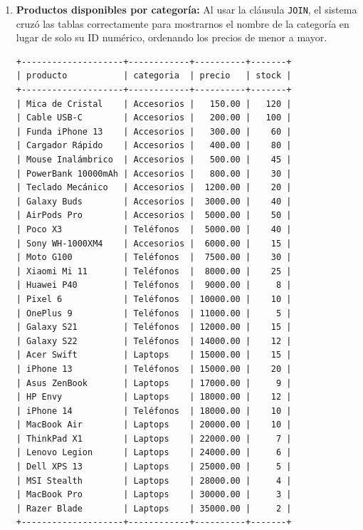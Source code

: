 \documentclass[10pt,letterpaper]{article}
\begin{document}
\begin{enumerate}
    \item \textbf{Productos disponibles por categor\'ia:}
    Al usar la cl\'ausula \texttt{JOIN}, el sistema cruz\'o las tablas correctamente para mostrarnos el nombre de la categor\'ia en lugar de solo su ID num\'erico, ordenando los precios de menor a mayor.
\begin{verbatim}
+--------------------+------------+----------+-------+
| producto           | categoria  | precio   | stock |
+--------------------+------------+----------+-------+
| Mica de Cristal    | Accesorios |   150.00 |   120 |
| Cable USB-C        | Accesorios |   200.00 |   100 |
| Funda iPhone 13    | Accesorios |   300.00 |    60 |
| Cargador Rápido    | Accesorios |   400.00 |    80 |
| Mouse Inalámbrico  | Accesorios |   500.00 |    45 |
| PowerBank 10000mAh | Accesorios |   800.00 |    30 |
| Teclado Mecánico   | Accesorios |  1200.00 |    20 |
| Galaxy Buds        | Accesorios |  3000.00 |    40 |
| AirPods Pro        | Accesorios |  5000.00 |    50 |
| Poco X3            | Teléfonos  |  5000.00 |    40 |
| Sony WH-1000XM4    | Accesorios |  6000.00 |    15 |
| Moto G100          | Teléfonos  |  7500.00 |    30 |
| Xiaomi Mi 11       | Teléfonos  |  8000.00 |    25 |
| Huawei P40         | Teléfonos  |  9000.00 |     8 |
| Pixel 6            | Teléfonos  | 10000.00 |    10 |
| OnePlus 9          | Teléfonos  | 11000.00 |     5 |
| Galaxy S21         | Teléfonos  | 12000.00 |    15 |
| Galaxy S22         | Teléfonos  | 14000.00 |    12 |
| Acer Swift         | Laptops    | 15000.00 |    15 |
| iPhone 13          | Teléfonos  | 15000.00 |    20 |
| Asus ZenBook       | Laptops    | 17000.00 |     9 |
| HP Envy            | Laptops    | 18000.00 |    12 |
| iPhone 14          | Teléfonos  | 18000.00 |    10 |
| MacBook Air        | Laptops    | 20000.00 |    10 |
| ThinkPad X1        | Laptops    | 22000.00 |     7 |
| Lenovo Legion      | Laptops    | 24000.00 |     6 |
| Dell XPS 13        | Laptops    | 25000.00 |     5 |
| MSI Stealth        | Laptops    | 28000.00 |     4 |
| MacBook Pro        | Laptops    | 30000.00 |     3 |
| Razer Blade        | Laptops    | 35000.00 |     2 |
+--------------------+------------+----------+-------+
\end{verbatim}


\end{enumerate}
\end{document}
